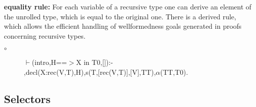 \documentclass[11pt]{report}
\begin{document}
\begin{enumerate}
 {\bf equality rule:}
 For each variable of a recursive type one can derive an element
 of the unrolled type, which is equal to the original one.
 There is a derived rule, which allows the efficient handling of
 wellformedness goals generated in proofs concerning recursive
 types.
 \begin{description}
 \item[$\circ$]
\begin{sf}\begin{tabbing}
$\vdash$(intro,H==$>$X in T0,[]):-\\[-0.15ex]
\hspace{2em}{\bf derived},decl(X:rec(V,T),H),s(T,[rec(V,T)],[V],TT),$\alpha$(TT,T0).
\end{tabbing}\end{sf}

 \end{description}
 \end{enumerate}
  
 \subsection{Selectors}
  
\end{document}
